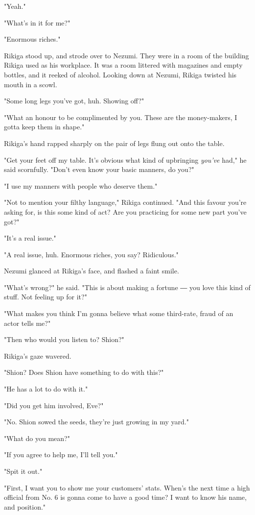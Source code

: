 "Yeah."

"What's in it for me?"

"Enormous riches."

Rikiga stood up, and strode over to Nezumi. They were in a room of the
building Rikiga used as his workplace. It was a room littered with
magazines and empty bottles, and it reeked of alcohol. Looking down at
Nezumi, Rikiga twisted his mouth in a scowl.

"Some long legs you've got, huh. Showing off?"

"What an honour to be complimented by you. These are the money-makers, I
gotta keep them in shape."

Rikiga's hand rapped sharply on the pair of legs flung out onto the
table.

"Get your feet off my table. It's obvious what kind of upbringing \emph{you've}
had," he said scornfully. "Don't even know your basic manners, do you?"

"I use my manners with people who deserve them."

"Not to mention your filthy language," Rikiga continued. "And this
favour you're asking for, is this some kind of act? Are you practicing
for some new part you've got?"

"It's a real issue."

"A real issue, huh. Enormous riches, you say? Ridiculous."

Nezumi glanced at Rikiga's face, and flashed a faint smile.

"What's wrong?" he said. "This is about making a fortune ― you love this
kind of stuff. Not feeling up for it?"

"What makes you think I'm gonna believe what some third-rate, fraud of
an actor tells me?"

"Then who would you listen to? Shion?"

Rikiga's gaze wavered.

"Shion? Does Shion have something to do with this?"

"He has a lot to do with it."

"Did you get him involved, Eve?"

"No. Shion sowed the seeds, they're just growing in my yard."

"What do you mean?"

"If you agree to help me, I'll tell you."

"Spit it out."

"First, I want you to show me your customers' stats. When's the next
time a high official from No. 6 is gonna come to have a good time? I
want to know his name, and position."

